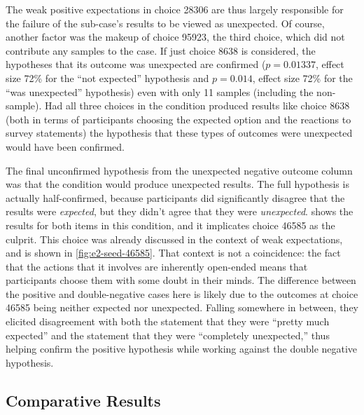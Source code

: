 The weak positive expectations in choice 28306 are thus largely responsible for the failure of the \obvfm{} sub-case's results to be viewed as unexpected.
%
Of course, another factor was the makeup of choice 95923, the third \obvf{} choice, which did not contribute any samples to the \casem{} case.
%
If just choice 8638 is considered, the hypotheses that its outcome was unexpected are confirmed ($p=0.01337$, effect size 72\% for the ``not expected'' hypothesis and $p=0.014$, effect size 72\% for the ``was unexpected'' hypothesis) even with only 11 samples (including the non-\casem{} sample).
%
Had all three choices in the \obv{} condition produced results like choice 8638 (both in terms of participants choosing the expected option and the reactions to survey statements) the hypothesis that these types of outcomes were unexpected would have been confirmed.


The final unconfirmed hypothesis from the unexpected negative outcome column was that the \unxf{} condition would produce unexpected results.
%
The full hypothesis is actually half-confirmed, because participants did significantly disagree that the results were \emph{expected}, but they didn't agree that they were \emph{unexpected}.
%
 shows the results for both items in this condition, and it implicates choice 46585 as the culprit.
%
This choice was already discussed in the context of weak expectations, and is shown in \cref{fig:e2-seed-46585}.
%
That context is not a coincidence: the fact that the actions that it involves are inherently open-ended means that participants choose them with some doubt in their minds.
%
The difference between the positive and double-negative cases here is likely due to the outcomes at choice 46585 being neither expected nor unexpected.
%
Falling somewhere in between, they elicited disagreement with both the statement that they were ``pretty much expected'' and the statement that they were ``completely unexpected,'' thus helping confirm the positive hypothesis while working against the double negative hypothesis.


\subsection{Comparative Results}

